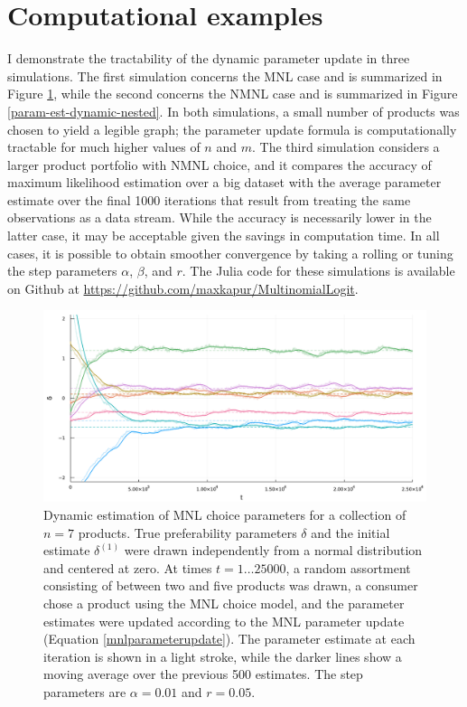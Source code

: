 \documentclass[preprint,12pt,authoryear]{elsarticle}
\begin{document}
\section{Computational examples}
I demonstrate the tractability of the dynamic parameter update in three simulations. The first simulation concerns the MNL case and is summarized in Figure \ref{param-est-dynamic-nonnested}, while the second concerns the NMNL case and is summarized in Figure \ref{param-est-dynamic-nested}. In both simulations, a small number of products was chosen to yield a legible graph; the parameter update formula is computationally tractable for much higher values of $n$ and $m$. The third simulation considers a larger product portfolio with NMNL choice, and it compares the accuracy of maximum likelihood estimation over a big dataset with the average parameter estimate over the final 1000 iterations that result from treating the same observations as a data stream. While the accuracy is necessarily lower in the latter case, it may be acceptable given the savings in computation time. In all cases, it is possible to obtain smoother convergence by taking a rolling or tuning the step parameters $\alpha$, $\beta$, and $r$. The Julia code for these simulations is available on Github at \url{https://github.com/maxkapur/MultinomialLogit}. 

\begin{figure}
\begin{center}\includegraphics[width=\textwidth]{../plots/param-est-dynamic-nonnested.pdf}\end{center}
\captionsetup{singlelinecheck=off}
    \caption[.]{Dynamic estimation of MNL choice parameters for a collection of $n = 7$ products. True preferability parameters $\delta$ and the initial estimate $\delta^{(1)}$ were drawn independently from a normal distribution and centered at zero. At times $t = 1 \dots 25000$, a random assortment consisting of between two and five products was drawn, a consumer chose a product using the MNL choice model, and the parameter estimates were updated according to the MNL parameter update (Equation \ref{mnlparameterupdate}). The parameter estimate at each iteration is shown in a light stroke, while the darker lines show a moving average over the previous 500 estimates. The step parameters are $\alpha = 0.01$ and $r = 0.05$.}
\label{param-est-dynamic-nonnested}
\end{figure}
\end{document}
